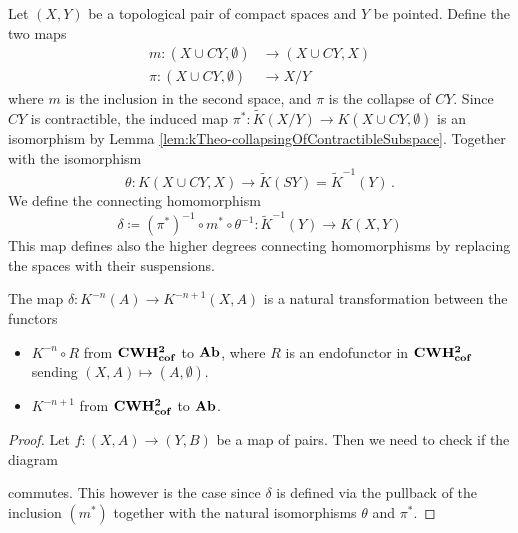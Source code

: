\begin{definition}\label{def:kTheo-connectingHomomorphism}
Let $(X,Y)$ be a topological pair of compact spaces and $Y$ be pointed. Define the two maps
\begin{align}
	m: (X \cup CY,\emptyset)&\to (X\cup CY,X)\\
	\pi: (X\cup CY,\emptyset)& \to X\big/Y
\end{align} where $m$ is the inclusion in the second space, and $\pi$ is the collapse of $CY$. Since $CY$ is contractible, the induced map $\pi^*:\tilde{K}(X\big/ Y)\to K(X \cup CY,\emptyset)$ is an isomorphism by Lemma \ref{lem:kTheo-collapsingOfContractibleSubspace}. Together with the isomorphism  
	\begin{equation*}
		\theta: K(X\cup CY,X)\to \tilde{K}(SY)=\tilde{K}^{-1}(Y)\,.
	\end{equation*}
	We define the connecting homomorphism 
	\begin{equation*}
		\delta\coloneq (\pi^*)^{-1}\circ m^*\circ \theta^{-1}:\tilde{K}^{-1}(Y)\to K(X,Y)
	\end{equation*} This map defines also the higher degrees connecting homomorphisms by replacing the spaces with their suspensions.
\end{definition}
\begin{remark}
	The map $\delta: K^{-n}(A)\to K^{-n+1}(X,A)$ is a natural transformation between the functors 
	\begin{itemize}
		\item $K^{-n}\circ R$ from $\operatorname{\mathbf{CWH^{2}_{cof}}}$ to $\operatorname{\mathbf{Ab}}$, where $R$ is an endofunctor in $\operatorname{\mathbf{CWH^{2}_{cof}}}$ sending $(X,A)\mapsto (A,\emptyset)$.
		\item $K^{-n+1}$ from $\operatorname{\mathbf{CWH^{2}_{cof}}}$ to $\operatorname{\mathbf{Ab}}$.
	\end{itemize}
\end{remark}
\begin{proof}
	Let $f:(X,A)\to (Y,B)$ be a map of pairs. Then we need to check if the diagram 
	\begin{center}
	\end{center} commutes. This however is the case since $\delta$ is defined via the pullback of the inclusion $(m^*)$ together with the natural isomorphisms $\theta$ and $\pi^*$. 
\end{proof}


